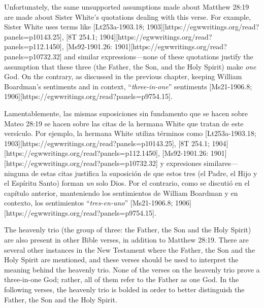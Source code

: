 Unfortunately, the same unsupported assumptions made about Matthew 28:19 are made about Sister White’s quotations dealing with this verse. For example, Sister White uses terms like [Lt253a-1903.18; 1903][https://egwwritings.org/read?panels=p10143.25], [8T 254.1; 1904][https://egwwritings.org/read?panels=p112.1450], [Ms92-1901.26: 1901][https://egwwritings.org/read?panels=p10732.32] and similar expressions—none of these quotations justify the assumption that these three (the Father, the Son, and the Holy Spirit) make \textit{one} God. On the contrary, as discussed in the previous chapter, keeping William Boardman’s sentiments and  in context, “\textit{three-in-one}” sentiments [Ms21-1906.8; 1906][https://egwwritings.org/read?panels=p9754.15].


Lamentablemente, las mismas suposiciones sin fundamento que se hacen sobre Mateo 28:19 se hacen sobre las citas de la hermana White que tratan de este versículo. Por ejemplo, la hermana White utiliza términos como [Lt253a-1903.18; 1903][https://egwwritings.org/read?panels=p10143.25], [8T 254.1; 1904][https://egwwritings.org/read?panels=p112.1450], [Ms92-1901.26: 1901][https://egwwritings.org/read?panels=p10732.32] y expresiones similares—ninguna de estas citas justifica la suposición de que estos tres (el Padre, el Hijo y el Espíritu Santo) forman \textit{un} solo Dios. Por el contrario, como se discutió en el capítulo anterior, manteniendo los sentimientos de William Boardman y  en contexto, los sentimientos “\textit{tres-en-uno}” [Ms21-1906.8; 1906][https://egwwritings.org/read?panels=p9754.15].


The heavenly trio (the group of three: the Father, the Son and the Holy Spirit) are also present in other Bible verses, in addition to Matthew 28:19. There are several other instances in the New Testament where the Father, the Son and the Holy Spirit are mentioned, and these verses should be used to interpret the meaning behind the heavenly trio. None of the verses on the heavenly trio prove a three-in-one God; rather, all of them refer to the Father as one God. In the following verses, the heavenly trio is bolded in order to better distinguish the Father, the Son and the Holy Spirit.


